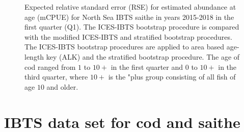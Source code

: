 \documentclass[a4paper 12pt]{article}
\numberwithin{equation}{section}
\begin{document}
\begin{figure}[h!]
\begin{tabular}{@{}ccc@{}}
\end{tabular}
\caption[]{Expected relative standard error (RSE) for estimated abundance at age (mCPUE) for North Sea IBTS saithe in years 2015-2018 in the first quarter (Q1). The ICES-IBTS bootstrap procedure is compared with the modified ICES-IBTS and stratified bootstrap procedures. The ICES-IBTS bootstrap procedures are applied to area based age-length key (ALK) and the stratified bootstrap procedure. The age of cod ranged from $1$ to $10+$ in the first quarter and $0$ to $10+$ in the third quarter, where $10+$ is the "plus group consisting of all fish of age $10$ and older.}
\label{AreaAreaModAllYearsQ1}
\end{figure} 

\clearpage

\section{\large IBTS data set for cod and saithe}
\label{secAp:data}
\end{document}
